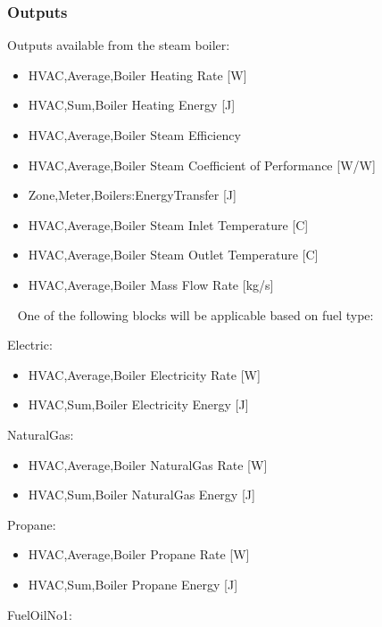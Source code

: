 \subsubsection{Outputs}\label{outputs-11-004}

Outputs available from the steam boiler:

\begin{itemize}
    \item
    HVAC,Average,Boiler Heating Rate {[}W{]}
    \item
    HVAC,Sum,Boiler Heating Energy {[}J{]}
    \item
    HVAC,Average,Boiler Steam Efficiency
    \item
    HVAC,Average,Boiler Steam Coefficient of Performance {[}W/W{]}
    \item
    Zone,Meter,Boilers:EnergyTransfer {[}J{]}
    \item
    HVAC,Average,Boiler Steam Inlet Temperature {[}C{]}
    \item
    HVAC,Average,Boiler Steam Outlet Temperature {[}C{]}
    \item
    HVAC,Average,Boiler Mass Flow Rate {[}kg/s{]}
\end{itemize}

~ One of the following blocks will be applicable based on fuel type:

Electric:

\begin{itemize}
    \item
    HVAC,Average,Boiler Electricity Rate {[}W{]}
    \item
    HVAC,Sum,Boiler Electricity Energy {[}J{]}
\end{itemize}

NaturalGas:

\begin{itemize}
    \item
    HVAC,Average,Boiler NaturalGas Rate {[}W{]}
    \item
    HVAC,Sum,Boiler NaturalGas Energy {[}J{]}
\end{itemize}

Propane:

\begin{itemize}
    \item
    HVAC,Average,Boiler Propane Rate {[}W{]}
    \item
    HVAC,Sum,Boiler Propane Energy {[}J{]}
\end{itemize}

FuelOilNo1:

